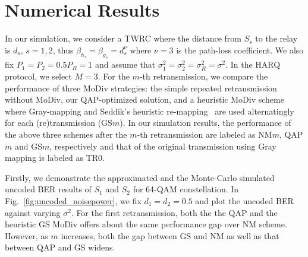 \documentclass[journal]{IEEEtran}
\begin{document}
\section{Numerical Results}
\label{sec:numerical}
In our simulation, we consider a TWRC where the distance from $S_s$ to the relay
is $d_s$, $s=1,2$, thus $\beta_{h_s} = \beta_{g_s} = d_s^{\nu}$ where $\nu=3$ is
the path-loss coefficient. We also fix $P_1=P_2=0.5P_R=1$ and assume that
$\sigma_1^2 = \sigma_2^2=\sigma_R^2 = \sigma^2$. In the HARQ protocol, we
select $M=3$. For the $m$-th
retransmission, we compare the performance of three MoDiv strategies: the simple
repeated retransmission without MoDiv, our QAP-optimized solution, and a
heuristic MoDiv scheme where Gray-mapping and Seddik's heuristic
re-mapping~\cite{seddik2008trans} are used alternatingly for each
(re)transmission (GS$m$). In our simulation results, the performance of the
above three schemes after the $m$-th retransmission are labeled as NM$m$, QAP$m$
and GS$m$, respectively and that of the original transmission using Gray mapping
is labeled as TR0.

Firstly, we demonstrate the approximated and the Monte-Carlo simulated
uncoded BER results of $S_1$ and $S_2$ for 64-QAM constellation. In
Fig.~\ref{fig:uncoded_noisepower}, we fix $d_1=d_2=0.5$ and plot the uncoded BER
against varying $\sigma^2$. For the
first retransmission, both the the QAP and the heuristic GS MoDiv offers about
the same performance gap over NM scheme. However, as $m$ increases, both the gap
between GS and NM as well as that between QAP and GS widens.
\end{document}
